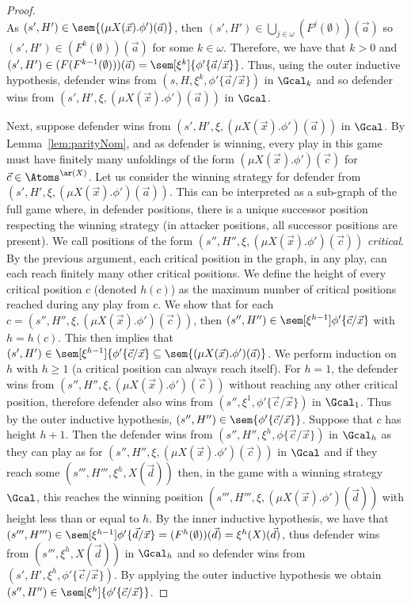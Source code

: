 \begin{proof}
	\\
	As $(s', H') \in \sem{(\mu X(\vec x).\phi')(\vec a)}$, then $(s', H') \in \bigcup_{j \in \omega} (F^j(\emptyset))(\vec a)$ so $(s', H') \in (F^k(\emptyset))(\vec a)$ for some $k \in \omega$. 
	Therefore, we have that $k > 0$ and $(s', H') \in (F(F^{k - 1}(\emptyset)))(\vec a) = \sem[\xi^k]{\phi'\{\vec a / \vec x\}}$.
	Thus, using the outer inductive hypothesis, defender wins from $(s, H, \xi^k, \phi'\{\vec a / \vec x\})$ in $\Gcal_k$ and so defender wins from $(s', H', \xi, (\mu X(\vec x).\phi')(\vec a))$ in $\Gcal$.
	
	Next, suppose defender wins from $(s', H', \xi, (\mu X(\vec x).\phi')(\vec a))$ in $\Gcal$. 
	By Lemma~\ref{lem:parityNom}, and as defender is winning, every play in this game must have finitely many unfoldings of the form $(\mu X(\vec x).\phi')(\vec c)$ for $\vec c \in \Atoms^{\ar(X)}$.
	Let us consider the winning strategy for defender from $(s', H', \xi, (\mu X(\vec x).\phi')(\vec a))$.
	This can be interpreted as a sub-graph of the full game where, in defender positions, there is a unique successor position respecting the winning strategy (in attacker positions, all successor positions are present). 
	We call positions of the form $(s'', H'', \xi, (\mu X(\vec x).\phi')(\vec c))$ \emph{critical}. 
	By the previous argument, each critical position in the graph, in any play, can each reach finitely many other critical positions. 
	We define the height of every critical position $c$ (denoted $h(c)$) as the maximum number of critical positions reached during any play from $c$. 
	We show that for each $c = (s'', H'', \xi, (\mu X(\vec x).\phi')(\vec c))$, then $(s'', H'')\in \sem[\xi^{h-1}]{\phi'\{\vec c / \vec x\}}$ with $h = h(c)$. 
	This then implies that $(s', H') \in \sem[\xi^{h - 1}]{\{\phi'\{\vec c / \vec x\}} \subseteq \sem{(\mu X(\vec x).\phi')(\vec a)}$.
	We perform induction on $h$ with $h \ge 1$ (a critical position can always reach itself). 
	For $h = 1$, the defender wins from $(s'',H'', \xi, (\mu X(\vec x).\phi')(\vec c))$ without reaching any other critical position, therefore defender also wins from $(s'', \xi^1, \phi'\{\vec c / \vec x\})$ in $\Gcal_1$.
	Thus by the outer inductive hypothesis, $(s'', H'') \in \sem{\phi'\{\vec c / \vec x\}}$.
	Suppose that $c$ has height $h + 1$. 
	Then the defender wins from $(s'', H'', \xi^h, \phi\{\vec c / \vec x\})$ in $\Gcal_h$ as they can play as for $(s'',H'', \xi, (\mu X(\vec x).\phi')(\vec c))$ in $\Gcal$ and if they reach some $(s''', H''', \xi^h, X(\vec d))$ then, in the game with a winning strategy $\Gcal$, this reaches the winning position $(s''', H''', \xi, (\mu X(\vec x).\phi')(\vec d))$ with height less than or equal to $h$. 
	By the inner inductive hypothesis, we have that $(s''', H''')\in \sem[\xi^{h-1}]{\phi'\{\vec d / \vec x\}} = (F^h(\emptyset))(\vec d) = \xi^h(X)(\vec d)$, thus defender wins from $(s''', \xi^h, X(\vec d))$ in $\Gcal_h$ and so defender wins from $(s', H', \xi^h, \phi'\{\vec c / \vec x\})$. 
	By applying the outer inductive hypothesis we obtain $(s'', H'')\in \sem[\xi^h]{\phi'\{\vec c / \vec x\}}$.  
	

\end{proof}
